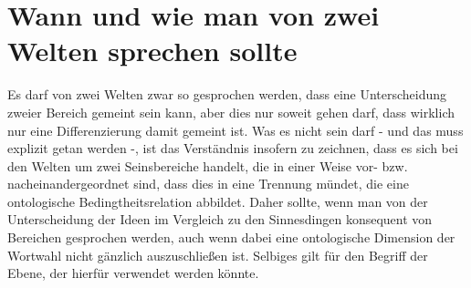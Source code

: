 \documentclass[12pt]{article}
\begin{document}
\section{Wann und wie man von zwei Welten sprechen sollte}
Es darf von zwei Welten zwar so gesprochen werden, dass eine Unterscheidung zweier Bereich gemeint sein kann, aber dies nur soweit gehen darf, dass wirklich nur eine Differenzierung damit gemeint ist. Was es nicht sein darf - und das muss explizit getan werden -, ist das Verständnis insofern zu zeichnen, dass es sich bei den Welten um zwei Seinsbereiche handelt, die in einer Weise vor- bzw. nacheinandergeordnet sind, dass dies in eine Trennung mündet, die eine ontologische Bedingtheitsrelation abbildet. Daher sollte, wenn man von der Unterscheidung der Ideen im Vergleich zu den Sinnesdingen konsequent von Bereichen gesprochen werden, auch wenn dabei eine ontologische Dimension der Wortwahl nicht gänzlich auszuschließen ist. Selbiges gilt für den Begriff der Ebene, der hierfür verwendet werden könnte.
\end{document}
